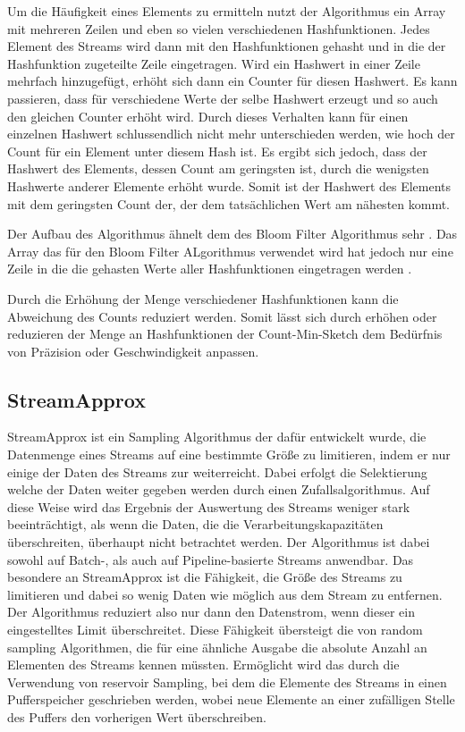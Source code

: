 Um die Häufigkeit eines Elements zu ermitteln 
nutzt der Algorithmus ein Array mit mehreren Zeilen 
und eben so vielen verschiedenen Hashfunktionen. 
Jedes Element des Streams wird dann mit den Hashfunktionen gehasht 
und in die der Hashfunktion zugeteilte Zeile eingetragen. 
Wird ein Hashwert in einer Zeile mehrfach hinzugefügt, 
erhöht sich dann ein Counter für diesen Hashwert. 
Es kann passieren, dass für verschiedene Werte der selbe Hashwert erzeugt 
und so auch den gleichen Counter erhöht wird. 
Durch dieses Verhalten kann für einen einzelnen Hashwert 
schlussendlich nicht mehr unterschieden werden, 
wie hoch der Count für ein Element unter diesem Hash ist. 
Es ergibt sich jedoch, dass der Hashwert des Elements, dessen Count am geringsten ist, 
durch die wenigsten Hashwerte anderer Elemente erhöht wurde. 
Somit ist der Hashwert des Elements mit dem geringsten Count der, 
der dem tatsächlichen Wert am nähesten kommt. \cite{cormode2017}

Der Aufbau des Algorithmus ähnelt dem des Bloom Filter Algorithmus sehr \cite{cormode2017}. 
Das Array das für den Bloom Filter ALgorithmus verwendet wird 
hat jedoch nur eine Zeile in die die gehasten Werte aller Hashfunktionen eingetragen werden \cite{cormode2017}.

Durch die Erhöhung der Menge verschiedener Hashfunktionen kann die Abweichung des Counts reduziert werden. 
Somit lässt sich durch erhöhen oder reduzieren der Menge an Hashfunktionen 
der Count-Min-Sketch dem Bedürfnis von Präzision oder Geschwindigkeit anpassen.

\subsection{StreamApprox}

StreamApprox ist ein Sampling Algorithmus der dafür entwickelt wurde, 
die Datenmenge eines Streams auf eine bestimmte Größe zu limitieren, 
indem er nur einige der Daten des Streams zur weiterreicht. 
Dabei erfolgt die Selektierung welche der Daten weiter gegeben werden durch einen Zufallsalgorithmus. 
Auf diese Weise wird das Ergebnis der Auswertung des Streams weniger stark beeinträchtigt, 
als wenn die Daten, die die Verarbeitungskapazitäten überschreiten, 
überhaupt nicht betrachtet werden. 
Der Algorithmus ist dabei sowohl auf Batch-, als auch auf Pipeline-basierte Streams anwendbar.
Das besondere an StreamApprox ist die Fähigkeit, 
die Größe des Streams zu limitieren und dabei so wenig Daten wie möglich aus dem Stream zu entfernen. 
Der Algorithmus reduziert also nur dann den Datenstrom, wenn dieser ein eingestelltes Limit überschreitet. 
Diese Fähigkeit übersteigt die von random sampling Algorithmen, 
die für eine ähnliche Ausgabe die absolute Anzahl an Elementen des Streams kennen müssten. 
Ermöglicht wird das durch die Verwendung von reservoir Sampling, 
bei dem die Elemente des Streams in einen Pufferspeicher geschrieben werden, 
wobei neue Elemente an einer zufälligen Stelle des Puffers den vorherigen Wert überschreiben. \cite{quoc2017} 

